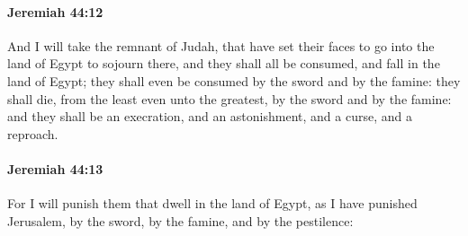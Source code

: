 		\paragraph{Jeremiah 44:12} %
			\label{JEREMIAH-44-12}

			And I will take the remnant of Judah, that have set their faces to go into the land of Egypt to sojourn there, and they shall all be consumed, and fall in the land of Egypt; they shall even be consumed by the sword and by the famine: they shall die, from the least even unto the greatest, by the sword and by the famine: and they shall be an execration, and an astonishment, and a curse, and a reproach.


		\paragraph{Jeremiah 44:13} %
			\label{JEREMIAH-44-13}

			For I will punish them that dwell in the land of Egypt, as I have punished Jerusalem, by the sword, by the famine, and by the pestilence:

